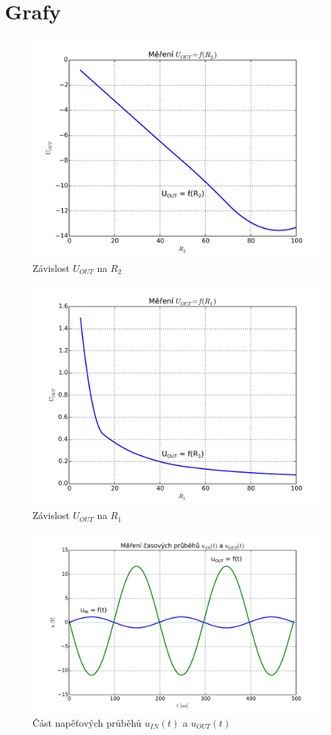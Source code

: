 \section{Grafy}
\setcounter{figure}{0}
  \renewcommand{\figurename}{Graf č.}
  
  \begin{figure}[H]
    \centering
    \includegraphics[width=12cm]{../img/g1.pdf}
    \caption{Závislost $U_{OUT}$ na $R_2$}
    \label{graf:1}
  \end{figure}
  
  \begin{figure}[H]
    \centering
    \includegraphics[width=12cm]{../img/g2.pdf}
    \caption{Závislost $U_{OUT}$ na $R_1$}
    \label{graf:2}
  \end{figure}
  
  \begin{figure}[H]
    \centering
    \includegraphics[width=13cm]{../img/g3.pdf}
    \caption{Část napěťových průběhů $u_{IN}(t)$ a $u_{OUT}(t)$}
    \label{graf:3}
  \end{figure}
